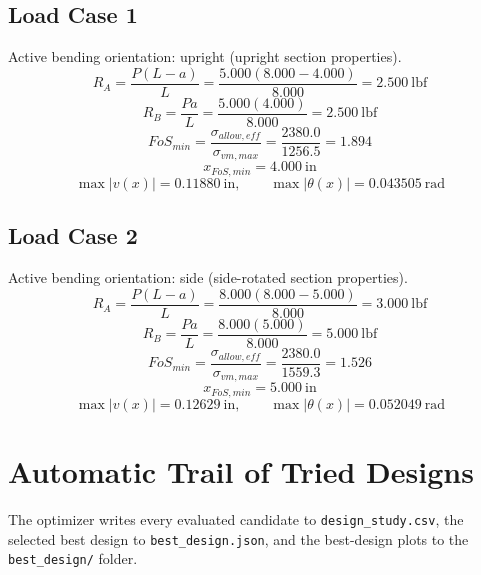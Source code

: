 \documentclass[11pt]{article}
\begin{document}
\subsection*{Load Case 1}
Active bending orientation: upright (upright section properties).
\[R_A = \frac{P(L-a)}{L} = \frac{5.000(8.000-4.000)}{8.000} = 2.500\ \mathrm{lbf}\]
\[R_B = \frac{Pa}{L} = \frac{5.000(4.000)}{8.000} = 2.500\ \mathrm{lbf}\]
\[FoS_{min} = \frac{\sigma_{allow,eff}}{\sigma_{vm,max}} = \frac{2380.0}{1256.5} = 1.894\]
\[x_{FoS,min} = 4.000\ \mathrm{in}\]
\[\max |v(x)| = 0.11880\ \mathrm{in}, \qquad \max |\theta(x)| = 0.043505\ \mathrm{rad}\]
\subsection*{Load Case 2}
Active bending orientation: side (side-rotated section properties).
\[R_A = \frac{P(L-a)}{L} = \frac{8.000(8.000-5.000)}{8.000} = 3.000\ \mathrm{lbf}\]
\[R_B = \frac{Pa}{L} = \frac{8.000(5.000)}{8.000} = 5.000\ \mathrm{lbf}\]
\[FoS_{min} = \frac{\sigma_{allow,eff}}{\sigma_{vm,max}} = \frac{2380.0}{1559.3} = 1.526\]
\[x_{FoS,min} = 5.000\ \mathrm{in}\]
\[\max |v(x)| = 0.12629\ \mathrm{in}, \qquad \max |\theta(x)| = 0.052049\ \mathrm{rad}\]

\section*{Automatic Trail of Tried Designs}
The optimizer writes every evaluated candidate to \texttt{design\_study.csv}, the selected best design to \texttt{best\_design.json}, and the best-design plots to the \texttt{best\_design/} folder.
\end{document}
